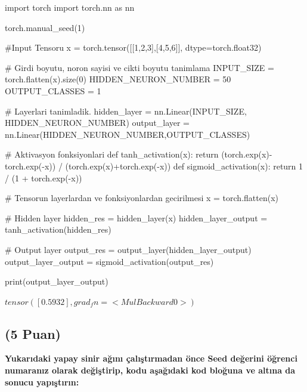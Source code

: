 \documentclass[11pt]{article}
\begin{document}
\begin{python}
import torch
import torch.nn as nn

torch.manual_seed(1)

#Input Tensoru
x = torch.tensor([[1,2,3],[4,5,6]], dtype=torch.float32)

# Girdi boyutu, noron sayisi ve cikti boyutu tanimlama
INPUT_SIZE = torch.flatten(x).size(0)
HIDDEN_NEURON_NUMBER = 50
OUTPUT_CLASSES = 1

# Layerlari tanimladik.
hidden_layer = nn.Linear(INPUT_SIZE, HIDDEN_NEURON_NUMBER)
output_layer = nn.Linear(HIDDEN_NEURON_NUMBER,OUTPUT_CLASSES)

# Aktivasyon fonksiyonlari
def tanh_activation(x):
  return (torch.exp(x)-torch.exp(-x)) / (torch.exp(x)+torch.exp(-x))
def sigmoid_activation(x):
  return 1 / (1 + torch.exp(-x))

# Tensorun layerlardan ve fonksiyonlardan gecirilmesi
x = torch.flatten(x)

# Hidden layer
hidden_res = hidden_layer(x)
hidden_layer_output = tanh_activation(hidden_res)

# Output layer
output_res = output_layer(hidden_layer_output)
output_layer_output = sigmoid_activation(output_res)

print(output_layer_output)
\end{python}

$tensor([0.5932], grad_fn=<MulBackward0>)$

\subsection{(5 Puan)} \textbf{Yukarıdaki yapay sinir ağını çalıştırmadan önce Seed değerini öğrenci numaranız olarak değiştirip, kodu aşağıdaki kod bloğuna ve altına da sonucu yapıştırın:}
\end{document}
